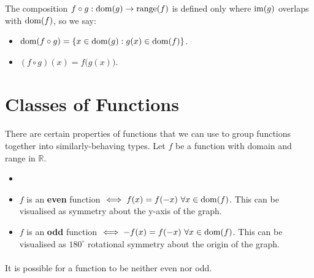 \documentclass[../real_analysis.tex]{subfiles}
\begin{document}
        \begin{definition}[Composition]
            The composition $f \circ g: \operatorname{dom}(g) \to \operatorname{range}(f)$ is defined only where $\operatorname{im}(g)$ overlaps with $\operatorname{dom}(f)$, so we say:
            \begin{itemize}
                \item $\operatorname{dom}(f \circ g) = \{x \in \operatorname{dom}(g) : g(x) \in \operatorname{dom}(f)\}$.
                \item $(f \circ g)(x) = f\big(g(x)\big)$.
            \end{itemize}
        \end{definition}

    \section{Classes of Functions}
        \paragraph{}
        There are certain properties of functions that we can use to group functions together into similarly-behaving types. Let $f$ be a function with domain and range in $\mathbb{R}$.
        \begin{definition}
            \begin{itemize} \item[]
                \item $f$ is an \textbf{even} function $\iff f(x) = f(-x)\ \forall x \in \operatorname{dom}(f)$. This can be visualised as symmetry about the y-axis of the graph.
                \item $f$ is an \textbf{odd} function $\iff -f(x) = f(-x)\ \forall x \in \operatorname{dom}(f)$. This can be visualised as $180^\circ$ rotational symmetry about the origin of the graph.
            \end{itemize}
            \paragraph{}
            It is possible for a function to be neither even nor odd.
        \end{definition}
\end{document}

